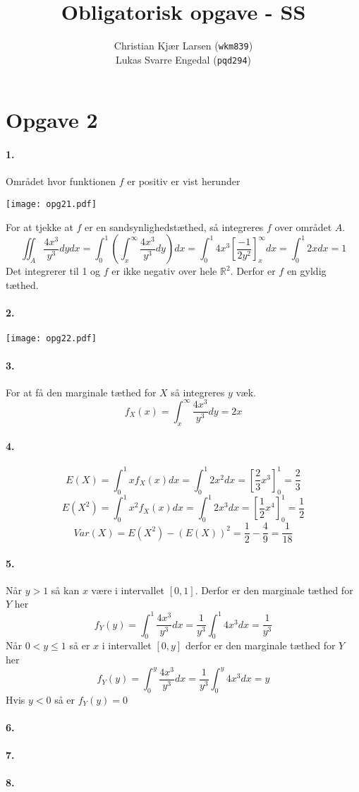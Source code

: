 \documentclass[12pt]{article}
\title{Obligatorisk opgave - SS}
\author{Christian Kjær Larsen (\texttt{wkm839})\\ Lukas Svarre Engedal (\texttt{pqd294})}
\begin{document}
\maketitle

\section*{Opgave 2}

\paragraph{1.}
Området hvor funktionen $f$ er positiv er vist herunder
\begin{center}
  \texttt{[image: opg21.pdf]}
\end{center}
For at tjekke at $f$ er en sandsynlighedstæthed, så integreres $f$ over området $A$.
\[
    \iint_A \frac{4x^3}{y^3} dydx = \int_0^1 \left( \int_x^\infty \frac{4x^3}{y^3} dy \right) dx
    = \int_0^1 4x^3 \left[ \frac{-1}{2y^2} \right]_x^\infty dx
    = \int_0^1 2x dx = 1
\]
Det integrerer til 1 og $f$ er ikke negativ over hele $\mathbb{R}^2$. Derfor er $f$ en gyldig tæthed.
\paragraph{2.}
\begin{center}
  \texttt{[image: opg22.pdf]}
\end{center}
\paragraph{3.}
For at få den marginale tæthed for $X$ så integreres $y$ væk.
\[
    f_X(x)=\int_x^\infty \frac{4x^3}{y^3} dy = 2x
\]
\paragraph{4.}
\[
    E(X) = \int_0^1 xf_X(x)dx = \int_0^1 2x^2 dx = \left[ \frac{2}{3}x^3 \right]_0^1 = \frac{2}{3}
\]
\[
    E(X^2) = \int_0^1 x^2 f_X(x)dx = \int_0^1 2x^3 dx = \left[ \frac{1}{2}x^4 \right]_0^1 = \frac{1}{2}
\]
\[
    Var(X) = E(X^2) - (E(X))^2 = \frac{1}{2} - \frac{4}{9} = \frac{1}{18}
\]
\paragraph{5.}
Når $y > 1$ så kan $x$ være i intervallet $[0,1]$. Derfor er den marginale tæthed for $Y$ her
\[
    f_Y(y) = \int_0^1 \frac{4x^3}{y^3} dx = \frac{1}{y^3} \int_0^1 4x^3 dx = \frac{1}{y^3}
\]
Når $0 < y \leq 1$ så er $x$ i intervallet $[0, y]$ derfor er den marginale tæthed for $Y$ her
\[
    f_Y(y) = \int_0^y \frac{4x^3}{y^3} dx = \frac{1}{y^3} \int_0^y 4x^3 dx = y
\]
Hvis $y < 0$ så er $f_Y(y) = 0$
\paragraph{6.}
\paragraph{7.}
\paragraph{8.}
\end{document}
